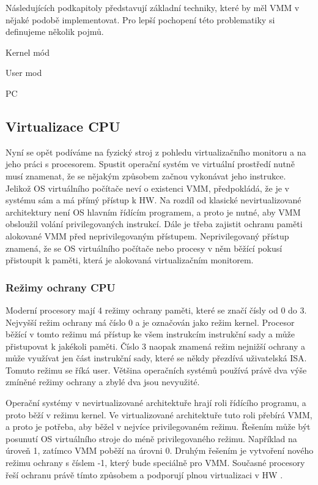 Následujících podkapitoly představují základní techniky, které by měl VMM v nějaké podobě implementovat. Pro lepší pochopení této problematiky si definujeme několik pojmů.

\begin{definition}
Kernel mód
\end{definition}

\begin{definition}
User mod
\end{definition}

\begin{definition}
PC
\end{definition}

\subsection{Virtualizace CPU}

Nyní se opět podíváme na fyzický stroj z pohledu virtualizačního monitoru a na jeho práci s procesorem. Spustit operační systém ve virtuální prostředí nutně musí znamenat, že se nějakým způsobem začnou vykonávat jeho instrukce.
Jelikož OS virtuálního počítače neví o existenci VMM, předpokládá, že je v systému sám a má přímý přístup k HW. Na rozdíl od klasické nevirtualizované architektury není OS hlavním řídícím programem, a proto je nutné, aby VMM obsloužil
volání privilegovaných instrukcí. Dále je třeba zajistit ochranu paměti alokované VMM před neprivilegovaným přístupem. Neprivilegovaný přístup znamená, že se OS virtuálního počítače nebo procesy v něm běžící pokusí přistoupit k paměti, 
která je alokovaná virtualizačním monitorem.

\subsubsection{Režimy ochrany CPU}

Moderní procesory mají 4 režimy ochrany paměti, které se značí čísly od 0 do 3. Nejvyšší režim ochrany má číslo 0 a je označován jako režim kernel. Procesor běžící v tomto režimu má přístup ke všem instrukcím instrukční sady a může přistupovat
k jakékoli paměti. Číslo 3 naopak znamená režim nejnižší ochrany a může využívat jen část instrukční sady, které se někdy přezdívá uživatelská ISA. Tomuto režimu se říká user. Většina operačních systémů používá právě dva výše zmíněné režimy ochrany
a zbylé dva jsou nevyužité.

Operační systémy v nevirtualizované architektuře hrají roli řídícího programu, a proto běží v režimu kernel. Ve virtualizované architektuře tuto roli přebírá VMM, a proto je potřeba, aby běžel v nejvíce privilegovaném režimu. Řešením může být
posunutí OS virtuálního stroje do méně privilegovaného režimu. Například na úroveň 1, zatímco VMM poběží na úrovni 0. Druhým řešením je vytvoření nového režimu ochrany s číslem -1, který bude speciálně pro VMM. Současné procesory řeší ochranu právě tímto
způsobem a podporují plnou virtualizaci v HW \cite{virt2}.

